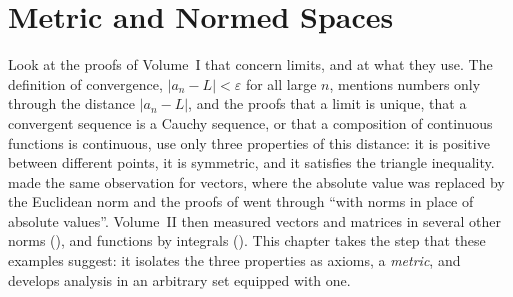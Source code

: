\chapter{Metric and Normed Spaces}
\label{ch:metric-spaces}


Look at the proofs of Volume~I that concern limits, and at what they use. The definition of convergence, $|a_n-L|<\varepsilon$ for all large $n$, mentions numbers only through the distance $|a_n-L|$, and the proofs that a limit is unique, that a convergent sequence is a Cauchy sequence, or that a composition of continuous functions is continuous, use only three properties of this distance: it is positive between different points, it is symmetric, and it satisfies the triangle inequality.  made the same observation for vectors, where the absolute value was replaced by the Euclidean norm and the proofs of  went through ``with norms in place of absolute values''. Volume~II then measured vectors and matrices in several other norms (), and functions by integrals (). This chapter takes the step that these examples suggest: it isolates the three properties as axioms, a \emph{metric}, and develops analysis in an arbitrary set equipped with one.

